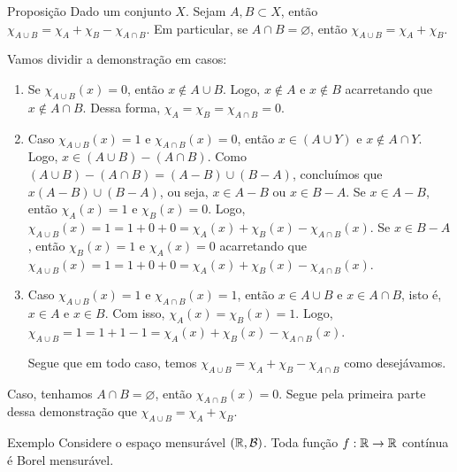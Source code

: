 \begin{env}{Proposição}
	\label{prop: propriedades de função característica}
	Dado um conjunto $X$. 
	Sejam $A, B \subset X$, então $\chi_{A\cup B} = \chi_A + \chi_B - \chi_{A \cap B}$.
	Em particular, se $A \cap B = \varnothing$, então $\chi_{A\cup B} = \chi_A + \chi_B$.
\end{env}
\begin{prova}
	Vamos dividir a demonstração em casos:
	\begin{enumerate}[label*=(\Roman*)]
		\item Se $\chi_{A\cup B}(x) = 0$, então $ x \notin A\cup B$. 
		Logo,  $x \notin A$ e $x \notin B$ acarretando que $x \notin A\cap B$.
		Dessa forma, $\chi_A = \chi_B =\chi_{A\cap B} = 0$.
		\item Caso $\chi_{A\cup B}(x) = 1$ e $\chi_{A\cap B}(x) = 0$, então $x \in (A\cup Y)$ e $x \notin A\cap Y$.
		Logo, $x \in (A\cup B) - (A\cap B)$.
		Como $(A\cup B) - (A\cap B) = (A- B) \cup (B - A)$, concluímos que $x (A - B) \cup (B - A)$, ou seja, $x \in A - B$ ou $x \in B - A$.
		Se $x \in A - B$, então $\chi_{A}(x) = 1$ e $\chi_B(x) = 0$.
		Logo, 	$\chi_{A\cup B}(x) = 1 = 1 + 0 + 0 = \chi_A(x) + \chi_B(x) - \chi_{A\cap B}(x)$.
		Se $x \in B - A$, então $\chi_B(x) = 1$ e $\chi_A(x) = 0$ acarretando que 
		$\chi_{A\cup B}(x) = 1 = 1 + 0 + 0 = \chi_A(x) + \chi_B(x) - \chi_{A\cap B}(x)$.
		\item Caso $\chi_{A\cup B}(x) = 1$ e $\chi_{A\cap B}(x) = 1$, então
		$x \in A \cup B$ e $x \in A \cap B$, isto é, $x \in A$ e $x \in B$.
		Com isso, $\chi_A(x) = \chi_B(x) = 1$.
		Logo, $\chi_{A\cup B} = 1 = 1 + 1 - 1 = \chi_A(x) + \chi_B(x) - \chi_{A\cap B}(x)$.
		
		Segue que em todo caso, temos $\chi_{A \cup B} = \chi_A + \chi_B - \chi_{A\cap B}$ como desejávamos.
	\end{enumerate}
	
	Caso, tenhamos $A \cap B = \varnothing$, então $\chi_{A\cap B}(x) = 0$. 
	Segue pela primeira parte dessa demonstração que $\chi_{A \cup B} = \chi_A + \chi_B$.
	
\end{prova}
\begin{env}{Exemplo}
\label{ex:função-continua-mensuravel}
    Considere o espaço mensurável $(\mathbb{R}, \operatorname{\mathcal{B}})$. Toda função $f: \mathbb{R} \to \mathbb{R}$ contínua é Borel mensurável.
    \vspace{-0.2cm}
\end{env}

